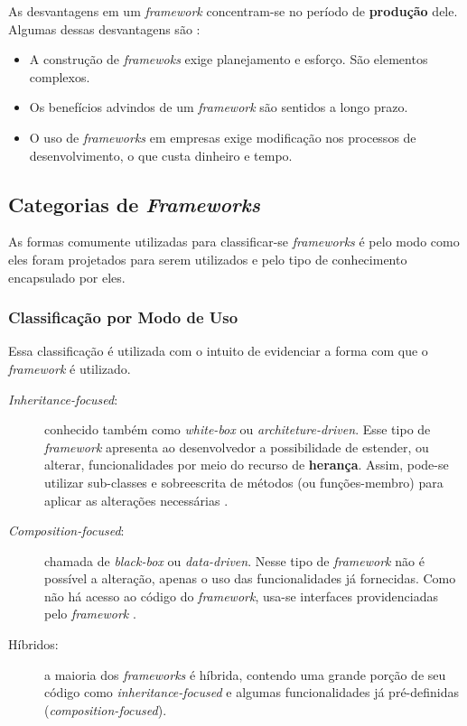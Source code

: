 As desvantagens em um \textit{framework} concentram-se no período de \textbf{produção} dele. Algumas dessas desvantagens são \cite{barretoJunior2006} \cite{sauve2006}:
\begin{itemize}
\item A construção de \textit{framewoks} exige planejamento e esforço. São elementos complexos.
\item Os benefícios advindos de um \textit{framework} são sentidos a longo prazo.
\item O uso de \textit{frameworks} em empresas exige modificação nos processos de desenvolvimento, o que custa dinheiro e tempo.
\end{itemize}
\par

\subsection{Categorias de \textit{Frameworks}}
As formas comumente utilizadas para classificar-se \textit{frameworks} é pelo modo como eles foram projetados para serem utilizados e pelo tipo de conhecimento encapsulado por eles.

\subsubsection{Classificação por Modo de Uso}
Essa classificação é utilizada com o intuito de evidenciar a forma com que o \textit{framework} é utilizado.
\begin{description}
\item[\textit{Inheritance-focused}:] conhecido também como \textit{white-box} ou \textit{architeture-driven}. Esse tipo de \textit{framework} apresenta ao desenvolvedor a possibilidade de estender, ou alterar, funcionalidades por meio do recurso de \textbf{herança}. Assim, pode-se utilizar sub-classes e sobreescrita de métodos (ou funções-membro) para aplicar as alterações necessárias \cite{sauve2006}.
\item[\textit{Composition-focused}:] chamada de \textit{black-box} ou \textit{data-driven}. Nesse tipo de \textit{framework}  não é possível a alteração, apenas o uso das funcionalidades já fornecidas. Como não há acesso ao código do \textit{framework}, usa-se interfaces providenciadas pelo \textit{framework} \cite{sauve2006}.
\item[Híbridos:] a maioria dos \textit{frameworks} é híbrida, contendo uma grande porção de seu código como \textit{inheritance-focused} e algumas funcionalidades já pré-definidas (\textit{composition-focused}).
\end{description}

